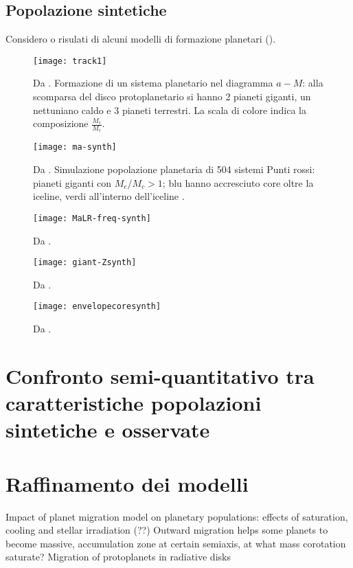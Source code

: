 \section{Popolazione sintetiche}

Considero o risulati di alcuni modelli di formazione planetari (\cite{mordasini2018planetary}). 

\begin{figure}
\texttt{[image: track1]}
\caption{Da \cite{mordasini2018planetary}. Formazione di un sistema planetario nel diagramma $a-M$: alla scomparsa del disco protoplanetario si hanno 2 pianeti giganti, un nettuniano caldo e 3 pianeti terrestri. La scala di colore indica la composizione $\frac{M_e}{M_c}$.}\label{fig:track1}
\end{figure}

\begin{figure}
\texttt{[image: ma-synth]}
\caption{Da \cite{mordasini2018planetary}. Simulazione popolazione planetaria di 504 sistemi Punti rossi: pianeti giganti con $M_e/M_c>1$; blu hanno accresciuto core oltre la iceline, verdi all'interno dell'iceline .}
\end{figure}

\begin{figure}
\texttt{[image: MaLR-freq-synth]}
\caption{Da \cite{mordasini2018planetary}. }
\end{figure}

\begin{figure}
\texttt{[image: giant-Zsynth]}
\caption{Da \cite{mordasini2018planetary}. }
\end{figure}

\begin{figure}
\texttt{[image: envelopecoresynth]}
\caption{Da \cite{mordasini2018planetary}. }
\end{figure}

{\let\clearpage\relax\let\cleardoublepage\relax
\chapter{Confronto semi-quantitativo tra caratteristiche popolazioni sintetiche e osservate}
}

{\let\clearpage\relax\let\cleardoublepage\relax
\chapter{Raffinamento dei modelli}
}


\begin{workout}
Impact of planet migration model on planetary populations: effects of saturation, cooling and stellar irradiation (??)
Outward migration helps some planets to become massive, accumulation zone at certain semiaxis, at what mass corotation saturate?
Migration of protoplanets in radiative disks
\end{workout}
